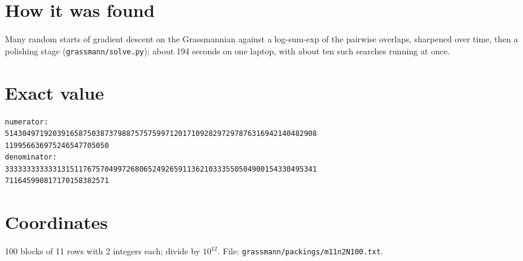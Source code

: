\documentclass[11pt,a4paper]{article}
\begin{document}
\section{How it was found}
Many random starts of gradient descent on the Grassmannian against a log-sum-exp of the pairwise overlaps, sharpened over time, then a polishing stage (\texttt{grassmann/solve.py}); about 194 seconds on one laptop, with about ten such searches running at once.


\appendix
\section{Exact value}
{\small
\begin{verbatim}
numerator:
514304971920391658750387379887575759971201710928297297876316942140482908
119956636975246547705050
denominator:
333333333333131511767570499726806524926591136210333550504900154330495341
711645990817170158382571
\end{verbatim}}

\section{Coordinates}
100 blocks of 11 rows with 2 integers each; divide by $10^{12}$. File: \texttt{grassmann/packings/m11n2N100.txt}.
{\tiny
\begin{multicols}{4}
\end{multicols}}
\end{document}
